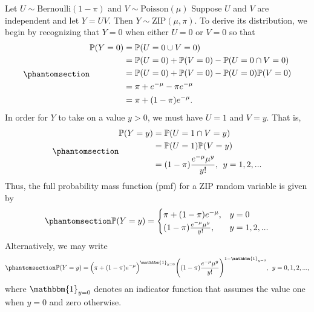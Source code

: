 \documentclass[
  12pt]{article}
\begin{document}
Let \(U \sim \text{Bernoulli}(1 - \pi)\) and
\(V \sim \text{Poisson}(\mu)\) Suppose \(U\) and \(V\) are independent
and let \(Y = UV\). Then \(Y \sim \text{ZIP}(\mu, \pi)\). To derive its
distribution, we begin by recognizing that \(Y = 0\) when either
\(U = 0\) or \(V = 0\) so that
\begin{equation}\phantomsection\label{eq-4-1-1}{
\begin{aligned}
\mathbb{P}(Y = 0) &= \mathbb{P}(U = 0 \cup V = 0) \\
                  &= \mathbb{P}(U = 0) + \mathbb{P}(V = 0) - \mathbb{P}(U = 0 \cap V = 0) \\
                  &= \mathbb{P}(U = 0) + \mathbb{P}(V = 0) - \mathbb{P}(U = 0)\mathbb{P}(V = 0) \\
                  &= \pi + e^{-\mu} - \pi e^{-\mu} \\ 
                  &= \pi + (1 - \pi)e^{-\mu}.
\end{aligned}
}\end{equation} In order for \(Y\) to take on a value \(y > 0\), we must
have \(U = 1\) and \(V = y\). That is,
\begin{equation}\phantomsection\label{eq-4-1-2}{
\begin{aligned}
\mathbb{P}(Y = y) &= \mathbb{P}(U = 1 \cap V = y) \\
                  &= \mathbb{P}(U = 1)\mathbb{P}(V = y) \\
                  &= (1-\pi)\frac{e^{-\mu}\mu^y}{y!}, \> \> y = 1, 2, ...
\end{aligned}
}\end{equation} Thus, the full probability mass function (pmf) for a ZIP
random variable is given by
\begin{equation}\phantomsection\label{eq-4-1-3}{
\mathbb{P}(Y = y) = \begin{cases}
               \pi + (1 - \pi)e^{-\mu}, &y =0 \\
               (1-\pi)\frac{e^{-\mu}\mu^y}{y!}, & y = 1, 2, ...
            \end{cases}
}\end{equation} Alternatively, we may write
\begin{equation}\phantomsection\label{eq-4-1-4}{
\mathbb{P}(Y = y) = \Big(\pi + (1 - \pi)e^{-\mu}\Big)^{\mathbbm{1}_{y = 0}}\Bigg(   (1-\pi)\frac{e^{-\mu}\mu^y}{y!}\Bigg)^{1 - {\mathbbm{1}_{y = 0}}}, \> \> y = 0, 1, 2, ...,
}\end{equation} where \(\mathbbm{1}_{y = 0}\) denotes an indicator
function that assumes the value one when \(y = 0\) and zero otherwise.
\end{document}
